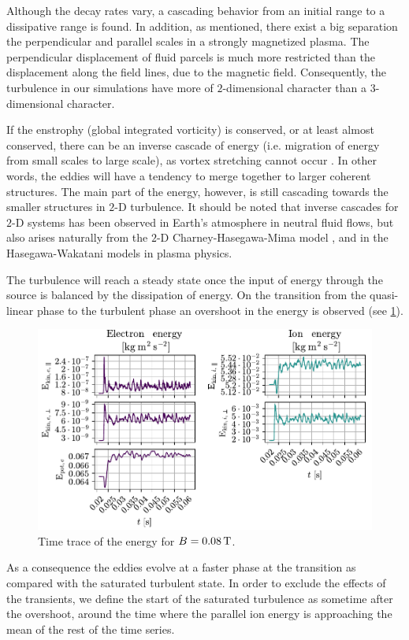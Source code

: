 Although the decay rates vary, a cascading behavior from an initial range to a dissipative range is found.
In addition, as mentioned, there exist a big separation the perpendicular and parallel scales in a strongly magnetized plasma.
The perpendicular displacement of fluid parcels is much more restricted than the displacement along the field lines, due to the magnetic field.
Consequently, the turbulence in our simulations have more of $2$-dimensional character than a $3$-dimensional character.

If the enstrophy (global integrated vorticity) is conserved, or at least almost conserved, there can be an inverse cascade of energy (i.e. migration of energy from small scales to large scale), as vortex stretching cannot occur \cite{Fjortoft1953}.
In other words, the eddies will have a tendency to merge together to larger coherent structures.
The main part of the energy, however, is still cascading towards the smaller structures in $2$-D turbulence.
It should be noted that inverse cascades for $2$-D systems has been observed in Earth's atmosphere \cite{Smith2002} in neutral fluid flows, but also arises naturally from the $2$-D Charney-Hasegawa-Mima model \cite{Boffetta2002}, and in the Hasegawa-Wakatani \cite{Manz2009} models in plasma physics.

The turbulence will reach a steady state once the input of energy through the source is balanced by the dissipation of energy.
On the transition from the quasi-linear phase to the turbulent phase an overshoot in the energy is observed (see \cref{fig:energyTrace008}).
%
\begin{figure}[htb]
    \centering
    \includegraphics{fig/results/energyTrace/energyTraceB008}
    \caption{Time trace of the energy for $B=0.08\, \text{T}$.}
    \label{fig:energyTrace008}
\end{figure}
%
As a consequence the eddies evolve at a faster phase at the transition as compared with the saturated turbulent state.
In order to exclude the effects of the transients, we define the start of the saturated turbulence as sometime after the overshoot, around the time where the parallel ion energy is approaching the mean of the rest of the time series.

